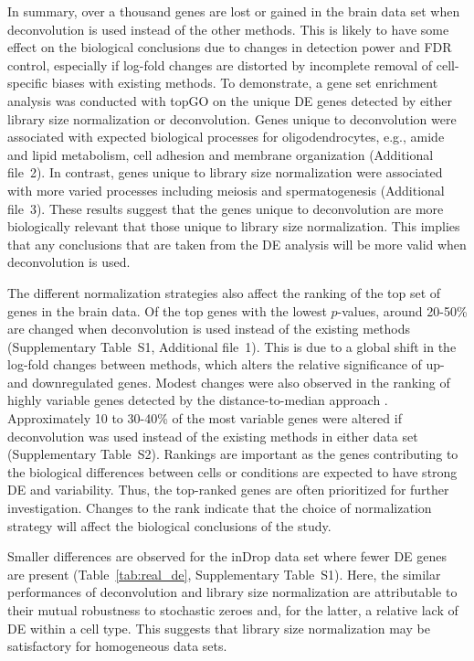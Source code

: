 \documentclass{bmcart}
\newcommand{\supprank}{S1}
\newcommand{\suppHVG}{S2}
\begin{document}
In summary, over a thousand genes are lost or gained in the brain data set when deconvolution is used instead of the other methods.
This is likely to have some effect on the biological conclusions due to changes in detection power and FDR control, 
    especially if log-fold changes are distorted by incomplete removal of cell-specific biases with existing methods.
To demonstrate, a gene set enrichment analysis was conducted with topGO \cite{alexa2010topgo} on the unique DE genes detected by either library size normalization or deconvolution.
Genes unique to deconvolution were associated with expected biological processes for oligodendrocytes, e.g., amide and lipid metabolism, cell adhesion and membrane organization (Additional file~2).
In contrast, genes unique to library size normalization were associated with more varied processes including meiosis and spermatogenesis (Additional file~3).
These results suggest that the genes unique to deconvolution are more biologically relevant that those unique to library size normalization.
This implies that any conclusions that are taken from the DE analysis will be more valid when deconvolution is used.

The different normalization strategies also affect the ranking of the top set of genes in the brain data.
Of the top genes with the lowest $p$-values, around 20-50\% are changed when deconvolution is used instead of the existing methods (Supplementary Table~\supprank{}, Additional file~1).
This is due to a global shift in the log-fold changes between methods, which alters the relative significance of up- and downregulated genes.
Modest changes were also observed in the ranking of highly variable genes detected by the distance-to-median approach \cite{kolod2015single}.
Approximately 10 to 30-40\% of the most variable genes were altered if deconvolution was used instead of the existing methods in either data set (Supplementary Table~\suppHVG{}).
Rankings are important as the genes contributing to the biological differences between cells or conditions are expected to have strong DE and variability.
Thus, the top-ranked genes are often prioritized for further investigation.
Changes to the rank indicate that the choice of normalization strategy will affect the biological conclusions of the study.

Smaller differences are observed for the inDrop data set where fewer DE genes are present (Table~\ref{tab:real_de}, Supplementary Table~\supprank{}).
Here, the similar performances of deconvolution and library size normalization are attributable to their mutual robustness to stochastic zeroes and, for the latter, a relative lack of DE within a cell type.
This suggests that library size normalization may be satisfactory for homogeneous data sets.
\end{document}
